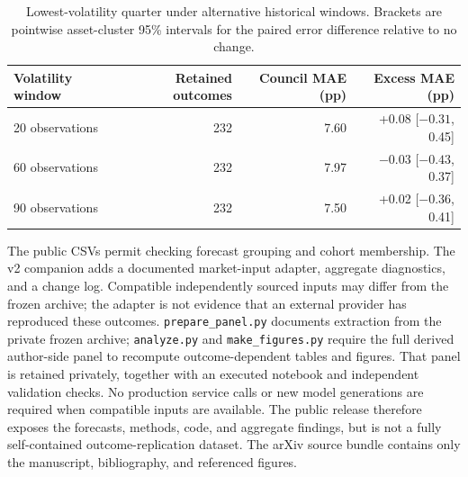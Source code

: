 \documentclass[11pt]{article}
\begin{document}
\begin{table}[H]
\centering\small
\begin{tabular}{lrrr}
\toprule
Volatility window & Retained outcomes & Council MAE (pp) & Excess MAE (pp)\\
\midrule
20 observations & 232 & 7.60 & +0.08 [$-0.31$, 0.45]\\
60 observations & 232 & 7.97 & $-0.03$ [$-0.43$, 0.37]\\
90 observations & 232 & 7.50 & +0.02 [$-0.36$, 0.41]\\
\bottomrule
\end{tabular}
\caption{Lowest-volatility quarter under alternative historical windows. Brackets are pointwise asset-cluster 95\% intervals for the paired error difference relative to no change.}
\end{table}

\FloatBarrier
The public CSVs permit checking forecast grouping and cohort membership. The v2 companion adds a documented market-input adapter, aggregate diagnostics, and a change log. Compatible independently sourced inputs may differ from the frozen archive; the adapter is not evidence that an external provider has reproduced these outcomes. \texttt{prepare\_panel.py} documents extraction from the private frozen archive; \texttt{analyze.py} and \texttt{make\_figures.py} require the full derived author-side panel to recompute outcome-dependent tables and figures. That panel is retained privately, together with an executed notebook and independent validation checks. No production service calls or new model generations are required when compatible inputs are available. The public release therefore exposes the forecasts, methods, code, and aggregate findings, but is not a fully self-contained outcome-replication dataset. The arXiv source bundle contains only the manuscript, bibliography, and referenced figures.


\end{document}
